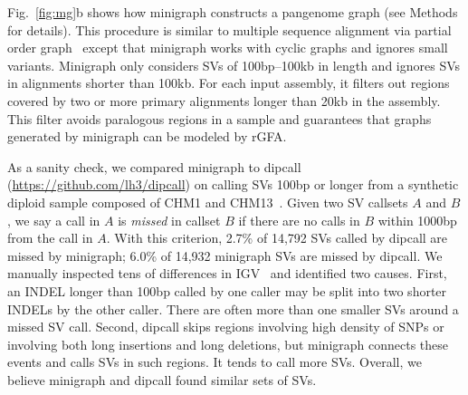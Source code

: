 \documentclass[twocolumn]{bmcart}%
\begin{document}
Fig.~\ref{fig:mg}b shows how minigraph constructs a pangenome graph (see
Methods for details). This procedure is similar to multiple sequence alignment
via partial order graph~\cite{Lee_2002} except that minigraph works with cyclic
graphs and ignores small variants. Minigraph only considers SVs of
100bp--100kb in length and ignores SVs in alignments shorter than 100kb.
For each input assembly, it filters out regions covered by two or more primary
alignments longer than 20kb in the assembly. This filter avoids paralogous
regions in a sample and guarantees that graphs generated by minigraph can be
modeled by rGFA.



As a sanity check, we compared minigraph to dipcall
(\href{https://github.com/lh3/dipcall}{https://github.com/lh3/dipcall}) on
calling SVs 100bp or longer from a synthetic diploid sample composed of CHM1
and CHM13~\cite{Li:2018aa}. Given two SV callsets $A$ and $B$, we say a call in
$A$ is \emph{missed} in callset $B$ if there are no calls in $B$ within 1000bp
from the call in $A$. With this criterion, 2.7\% of 14,792 SVs called by
dipcall are missed by minigraph; 6.0\% of 14,932 minigraph SVs are missed by
dipcall. We manually inspected tens of differences in
IGV~\cite{Robinson:2011aa} and identified two causes. First, an INDEL longer
than 100bp called by one caller may be split into two shorter INDELs by the
other caller. There are often more than one smaller SVs around a missed SV
call. Second, dipcall skips regions involving high density of SNPs or involving
both long insertions and long deletions, but minigraph connects these events
and calls SVs in such regions. It tends to call more SVs. Overall, we believe
minigraph and dipcall found similar sets of SVs.
\end{document}
